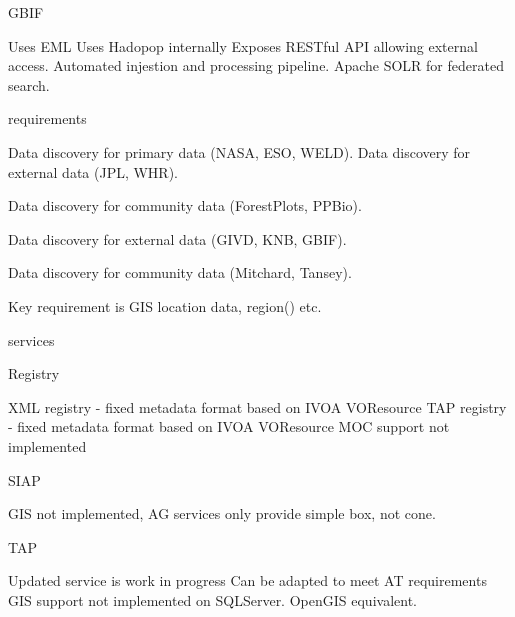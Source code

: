 \documentclass{article}
\begin{document}
GBIF

Uses EML
Uses Hadopop internally
Exposes RESTful API allowing external access.
Automated injestion and processing pipeline.
Apache SOLR for federated search.





\cite{trop} requirements

    Data discovery for primary data (NASA, ESO, WELD).
    Data discovery for external data (JPL, WHR).

    Data discovery for community data (ForestPlots, PPBio).

    Data discovery for external data (GIVD, KNB, GBIF).

    Data discovery for community data (Mitchard, Tansey).

    Key requirement is GIS location data, region() etc.

\cite{astro} services

    Registry

        XML registry - fixed metadata format based on IVOA VOResource
        TAP registry - fixed metadata format based on IVOA VOResource
        MOC support not implemented

    SIAP
    
        GIS not implemented, AG services only provide simple box, not cone.

    TAP
    
        Updated service is work in progress
        Can be adapted to meet AT requirements
        GIS support not implemented on SQLServer.
        OpenGIS equivalent.










%
%

\printbibliography
\end{document}
